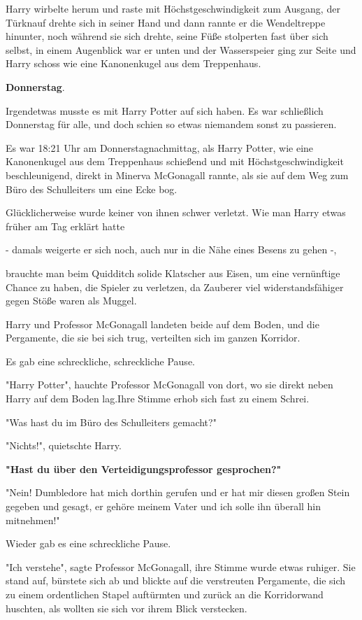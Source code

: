{Harry wirbelte herum und raste mit Höchstgeschwindigkeit zum Ausgang, der Türknauf drehte sich in seiner Hand und dann rannte er die Wendeltreppe hinunter, noch während sie sich drehte, seine Füße stolperten fast über sich selbst, in einem Augenblick war er unten und der Wasserspeier ging zur Seite und Harry schoss wie eine Kanonenkugel aus dem Treppenhaus.

\textbf{Donnerstag}.

Irgendetwas musste es mit Harry Potter auf sich haben. Es war schließlich Donnerstag für alle, und doch schien so etwas niemandem sonst zu passieren.

Es war 18:21 Uhr am Donnerstagnachmittag, als Harry Potter, wie eine Kanonenkugel aus dem Treppenhaus schießend und mit Höchstgeschwindigkeit beschleunigend, direkt in Minerva McGonagall rannte, als sie auf dem Weg zum Büro des Schulleiters um eine Ecke bog.

Glücklicherweise wurde keiner von ihnen schwer verletzt. Wie man Harry etwas früher am Tag erklärt hatte

- damals weigerte er sich noch, auch nur in die Nähe eines Besens zu gehen -,

brauchte man beim Quidditch solide Klatscher aus Eisen, um eine vernünftige Chance zu haben, die Spieler zu verletzen, da Zauberer viel widerstandsfähiger gegen Stöße waren als Muggel.

Harry und Professor McGonagall landeten beide auf dem Boden, und die Pergamente, die sie bei sich trug, verteilten sich im ganzen Korridor.

Es gab eine schreckliche, schreckliche Pause.

"Harry Potter", hauchte Professor McGonagall von dort, wo sie direkt neben Harry auf dem Boden lag.Ihre Stimme erhob sich fast zu einem Schrei.

"Was hast du im Büro des Schulleiters gemacht?"

"Nichts!", quietschte Harry.

\textbf{"Hast du über den Verteidigungsprofessor gesprochen?"}

"Nein! Dumbledore hat mich dorthin gerufen und er hat mir diesen großen Stein gegeben und gesagt, er gehöre meinem Vater und ich solle ihn überall hin mitnehmen!"

Wieder gab es eine schreckliche Pause.

"Ich verstehe", sagte Professor McGonagall, ihre Stimme wurde etwas ruhiger. Sie stand auf, bürstete sich ab und blickte auf die verstreuten Pergamente, die sich zu einem ordentlichen Stapel auftürmten und zurück an die Korridorwand huschten, als wollten sie sich vor ihrem Blick verstecken.

}
